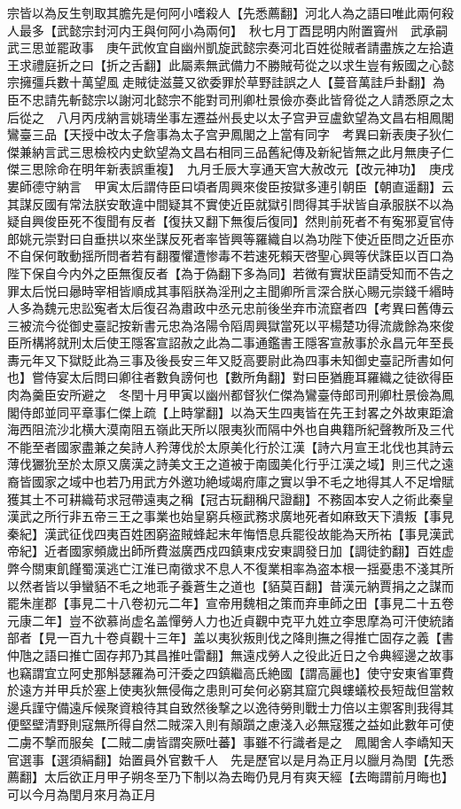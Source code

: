 宗皆以為反生刳取其膽先是何阿小嗜殺人【先悉薦翻】河北人為之語曰唯此兩何殺人最多【武懿宗封河内王與何阿小為兩何】　秋七月丁酉昆明内附置竇州　武承嗣武三思並罷政事　庚午武攸宜自幽州凱旋武懿宗奏河北百姓從賊者請盡族之左拾遺王求禮庭折之曰【折之舌翻】此屬素無武備力不勝賊苟從之以求生豈有叛國之心懿宗擁彊兵數十萬望風走賊徒滋蔓又欲委罪於草野詿誤之人【蔓音萬詿戶卦翻】為臣不忠請先斬懿宗以謝河北懿宗不能對司刑卿杜景儉亦奏此皆脅從之人請悉原之太后從之　八月丙戌納言姚璹坐事左遷益州長史以太子宫尹豆盧欽望為文昌右相鳳閣鸞臺三品【天授中改太子詹事為太子宫尹鳳閣之上當有同字　考異曰新表庚子狄仁傑兼納言武三思檢校内史欽望為文昌右相同三品舊紀傳及新紀皆無之此月無庚子仁傑三思除命在明年新表誤重複】　九月壬辰大享通天宫大赦改元【改元神功】　庚戌婁師德守納言　甲寅太后謂侍臣曰頃者周興來俊臣按獄多連引朝臣【朝直遥翻】云其謀反國有常法朕安敢違中間疑其不實使近臣就獄引問得其手狀皆自承服朕不以為疑自興俊臣死不復聞有反者【復扶又翻下無復后復同】然則前死者不有寃邪夏官侍郎姚元崇對曰自垂拱以來坐謀反死者率皆興等羅織自以為功陛下使近臣問之近臣亦不自保何敢動揺所問者若有翻覆懼遭惨毒不若速死賴天啓聖心興等伏誅臣以百口為陛下保自今内外之臣無復反者【為于偽翻下多為同】若微有實狀臣請受知而不告之罪太后悦曰曏時宰相皆順成其事䧟朕為淫刑之主聞卿所言深合朕心賜元崇錢千緡時人多為魏元忠訟寃者太后復召為肅政中丞元忠前後坐弃市流竄者四【考異曰舊傳云三被流今從御史臺記按新書元忠為洛陽令䧟周興獄當死以平楊楚功得流歲餘為來俊臣所構將就刑太后使王隱客宣詔赦之此為二事通鑑書王隱客宣赦事於永昌元年至長夀元年又下獄貶此為三事及後長安三年又貶高要尉此為四事未知御史臺記所書如何也】嘗侍宴太后問曰卿往者數負謗何也【數所角翻】對曰臣猶鹿耳羅織之徒欲得臣肉為羹臣安所避之　冬閏十月甲寅以幽州都督狄仁傑為鸞臺侍郎司刑卿杜景儉為鳳閣侍郎並同平章事仁傑上疏【上時掌翻】以為天生四夷皆在先王封畧之外故東距滄海西阻流沙北横大漠南阻五嶺此天所以限夷狄而隔中外也自典籍所紀聲教所及三代不能至者國家盡兼之矣詩人矜薄伐於太原美化行於江漢【詩六月宣王北伐也其詩云薄伐玁狁至於太原又廣漢之詩美文王之道被于南國美化行乎江漢之域】則三代之遠裔皆國家之域中也若乃用武方外邀功絶域竭府庫之實以爭不毛之地得其人不足增賦獲其土不可耕織苟求冠帶遠夷之稱【冠古玩翻稱尺證翻】不務固本安人之術此秦皇漢武之所行非五帝三王之事業也始皇窮兵極武務求廣地死者如麻致天下潰叛【事見秦紀】漢武征伐四夷百姓困窮盗賊蜂起末年悔悟息兵罷役故能為天所祐【事見漢武帝紀】近者國家頻歲出師所費滋廣西戍四鎮東戍安東調發日加【調徒釣翻】百姓虚弊今關東飢饉蜀漢逃亡江淮已南徵求不息人不復業相率為盗本根一揺憂患不淺其所以然者皆以爭蠻貊不毛之地乖子養蒼生之道也【貊莫百翻】昔漢元納賈捐之之謀而罷朱崖郡【事見二十八卷初元二年】宣帝用魏相之策而弃車師之田【事見二十五卷元康二年】豈不欲慕尚虚名盖憚勞人力也近貞觀中克平九姓立李思摩為可汗使統諸部者【見一百九十卷貞觀十三年】盖以夷狄叛則伐之降則撫之得推亡固存之義【書仲虺之語曰推亡固存邦乃其昌推吐雷翻】無遠戍勞人之役此近日之令典經邊之故事也竊謂宜立阿史那斛瑟羅為可汗委之四鎮繼高氏絶國【謂高麗也】使守安東省軍費於遠方并甲兵於塞上使夷狄無侵侮之患則可矣何必窮其窟宂與螻蟻校長短哉但當敕邊兵謹守備遠斥候聚資粮待其自致然後撃之以逸待勞則戰士力倍以主禦客則我得其便堅壁清野則寇無所得自然二賊深入則有顛躓之慮淺入必無寇獲之益如此數年可使二虜不撃而服矣【二賊二虜皆謂突厥吐蕃】事雖不行識者是之　鳳閣舍人李嶠知天官選事【選須絹翻】始置員外官數千人　先是歷官以是月為正月以臘月為閏【先悉薦翻】太后欲正月甲子朔冬至乃下制以為去晦仍見月有爽天經【去晦謂前月晦也】可以今月為閏月來月為正月

